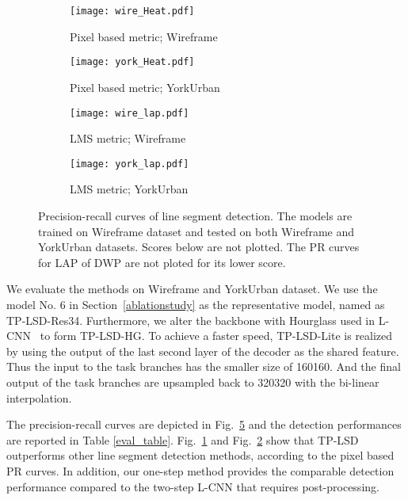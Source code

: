 \documentclass[runningheads]{llncs}
\begin{document}
\begin{figure}[t]
\begin{center}
     \begin{subfigure}[b]{0.24\textwidth}
         \centering
         \texttt{[image: wire\_Heat.pdf]}
         \caption{\centering Pixel based metric; Wireframe} 
         \label{sub_fig:pr_a}
     \end{subfigure}
     \begin{subfigure}[b]{0.24\textwidth}
         \centering
         \texttt{[image: york\_Heat.pdf]}
\caption{\centering Pixel based metric; YorkUrban} 
         \label{sub_fig:pr_b}
     \end{subfigure}
     \begin{subfigure}[b]{0.24\textwidth}
         \centering
         \texttt{[image: wire\_lap.pdf]}
         \caption{\centering LMS metric; Wireframe} \label{sub_fig:pr_c}
     \end{subfigure}
     \begin{subfigure}[b]{0.24\textwidth}
         \centering
         \texttt{[image: york\_lap.pdf]}
         \caption{\centering LMS metric; YorkUrban} 
         \label{sub_fig:pr_d}
     \end{subfigure}
  \end{center}
    \caption{Precision-recall curves of line segment detection. The models are trained on Wireframe dataset and tested on both Wireframe and YorkUrban datasets. Scores below  are not plotted. The PR curves for LAP of DWP are not ploted for its lower score.}
    \label{PR_pixel}
\end{figure}


We evaluate the methods on Wireframe and YorkUrban dataset. We use the model No. 6 in Section~\ref{ablationstudy} as the representative model, named as TP-LSD-Res34. Furthermore, we alter the backbone with Hourglass used in L-CNN~\cite{LCNN} to form TP-LSD-HG. To achieve a faster speed, TP-LSD-Lite is realized by using the output of the last second layer of the decoder as the shared feature. Thus the input to the task branches has the smaller size of 160160. And the final output of the task branches are upsampled back to 320320 with the bi-linear interpolation.


The precision-recall curves are depicted in Fig.~\ref{PR_pixel} and the detection performances are reported in Table \ref{eval_table}.
Fig.~\ref{sub_fig:pr_a} and Fig.~\ref{sub_fig:pr_b} show that TP-LSD outperforms other line segment detection methods, according to the pixel based PR curves. In addition, our one-step method provides the comparable detection performance compared to the two-step L-CNN that requires post-processing.
\end{document}
